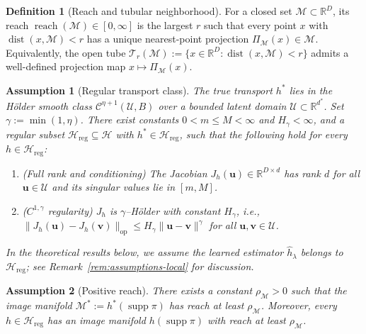 \documentclass[12pt]{article}
\newtheorem{assumption}{Assumption}
\theoremstyle{definition} %
\newtheorem{definition}{Definition}
\newcommand{\R}{\mathbb{R}}
\newcommand{\M}{\mathcal{M}}
\newcommand{\dist}{\operatorname{dist}}
\newcommand{\reach}{\operatorname{reach}}
\newcommand{\supp}{\operatorname{supp}}
\begin{document}
\begin{definition}[Reach and tubular neighborhood]\label{def:reach}
For a closed set $\mathcal M\subset\R^D$, its reach $\reach(\mathcal M)\in[0,\infty]$ is the largest $r$ such that
every point $x$ with $\dist(x,\mathcal M)<r$ has a unique nearest-point projection $\Pi_{\mathcal M}(x)\in\mathcal M$.
Equivalently, the open tube $\mathcal T_r(\mathcal M):=\{x\in\R^D:\dist(x,\mathcal M)<r\}$ admits a well-defined projection map
$x\mapsto \Pi_{\mathcal M}(x)$.
\end{definition}

\begin{assumption}[Regular transport class]\label{G1}
The true transport $h^*$ lies in the H\"older smooth class $\mathcal{C}^{\eta+1}(\mathcal{U},B)$ over a bounded latent domain $\mathcal{U}\subset\mathbb{R}^{d^*}$.
Set $\gamma:=\min(1,\eta)$.
There exist constants $0<m\le M<\infty$ and $H_\gamma<\infty$, and a regular subset $\mathcal{H}_{\mathrm{reg}}\subseteq\mathcal{H}$ with $h^*\in\mathcal{H}_{\mathrm{reg}}$, such that the following hold for every $h\in\mathcal{H}_{\mathrm{reg}}$:
\begin{enumerate}
\item[(i)] (Full rank and conditioning) The Jacobian $J_h(\bm u)\in\mathbb{R}^{D\times d}$ has rank $d$ for all $\bm u\in\mathcal{U}$ and its singular values lie in $[m,M]$.
\item[(ii)] ($C^{1,\gamma}$ regularity) $J_h$ is $\gamma$--H\"older with constant $H_\gamma$, i.e.,
$\|J_h(\bm u)-J_h(\bm v)\|_{\mathrm{op}}\le H_\gamma \|\bm u-\bm v\|^\gamma$ for all $\bm u,\bm v\in\mathcal{U}$.
\end{enumerate}
In the theoretical results below, we assume the learned estimator $\hat h_{\lambda}$ belongs to $\mathcal{H}_{\mathrm{reg}}$; see Remark~\ref{rem:assumptions-local} for discussion.
\end{assumption}

\begin{assumption}[Positive reach]\label{G2}
There exists a constant $\rho_{\M}>0$ such that the image manifold $\mathcal{M}^*:=h^*(\supp\pi)$ has reach at least $\rho_{\M}$.
Moreover, every $h\in\mathcal{H}_{\mathrm{reg}}$ has an image manifold $h(\supp\pi)$ with reach at least $\rho_{\M}$.
\end{assumption}
\end{document}
